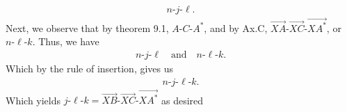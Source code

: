 \documentclass{report}
\begin{document}
    \begin{align*}
        n\text{-}j\text{-}\ell
    .\end{align*}
    Next, we observe that by theorem 9.1, $ A\text{-}C\text{-}A^{*}$, and by Ax.C, $ \overrightarrow{XA}\text{-}\overrightarrow{XC}\text{-}\overrightarrow{XA^{*}} $, or $ n\text{-}\ell\text{-}k$. Thus, we have
    \begin{align*}
        n\text{-}j\text{-}\ell \quad \text{and} \quad n\text{-}\ell\text{-}k
    .\end{align*}
    Which by the rule of insertion, gives us
    \begin{align*}
        n\text{-}j\text{-}\ell\text{-}k
    .\end{align*}
    Which yields $ j\text{-}\ell\text{-}k = \overrightarrow{XB}\text{-}\overrightarrow{XC}\text{-}\overrightarrow{XA^{*}}$ as desired \endpf
\end{document}
